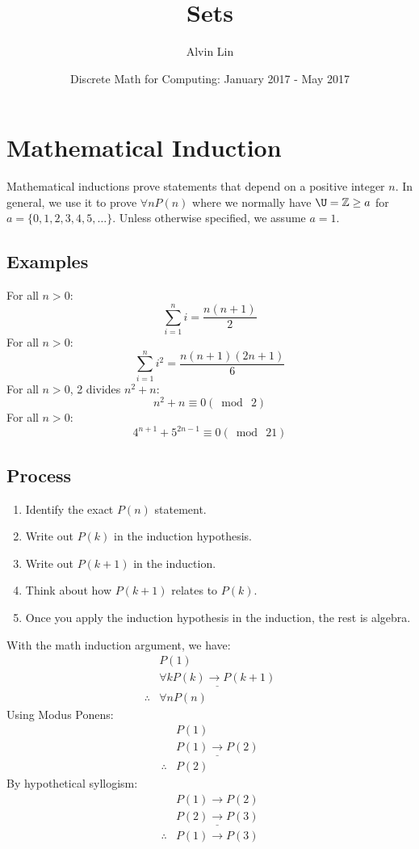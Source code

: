 \documentclass[letterpaper, 12pt]{math}
\title{Sets}
\author{Alvin Lin}
\date{Discrete Math for Computing: January 2017 - May 2017}
\begin{document}
\maketitle

\section*{Mathematical Induction}
Mathematical inductions prove statements that depend on a positive integer
\( n \). In general, we use it to prove \( \forall{n}P(n) \) where we
normally have \( \U = \Z\geq a \) for \( a = \{0,1,2,3,4,5,\dots\} \).
Unless otherwise specified, we assume \( a = 1 \).

\subsection*{Examples}
For all \( n > 0 \):
\[ \sum_{i=1}^{n}i = \frac{n(n+1)}{2} \]
For all \( n > 0 \):
\[ \sum_{i=1}^{n}i^{2} = \frac{n(n+1)(2n+1)}{6} \]
For all \( n > 0 \), 2 divides \( n^{2} + n \):
\[ n^{2}+n \equiv 0(\bmod\ 2) \]
For all \( n > 0 \):
\[ 4^{n+1}+5^{2n-1} \equiv 0(\bmod\ 21) \]

\subsection*{Process}
\begin{enumerate}
  \item Identify the exact \( P(n) \) statement.
  \item Write out \( P(k) \) in the induction hypothesis.
  \item Write out \( P(k+1) \) in the induction.
  \item Think about how \( P(k+1) \) relates to \( P(k) \).
  \item Once you apply the induction hypothesis in the induction, the rest is
    algebra.
\end{enumerate}
With the math induction argument, we have:
\begin{align*}
  & P(1) \\
  & \underline{\forall{k}P(k)\to P(k+1)} \\
  \therefore{} & \forall{n}P(n)
\end{align*}
Using Modus Ponens:
\begin{align*}
  & P(1) \\
  & \underline{P(1)\to P(2)} \\
  \therefore{} & P(2)
\end{align*}
By hypothetical syllogism:
\begin{align*}
  & P(1)\to P(2) \\
  & \underline{P(2)\to P(3)} \\
  \therefore{} & P(1)\to P(3) \\
\end{align*}
\end{document}
